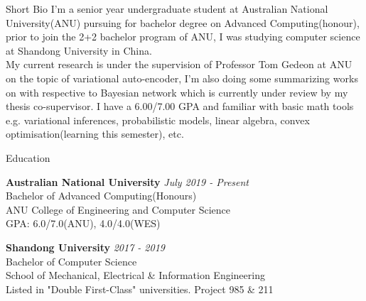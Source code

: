 \documentclass{resume} %
\begin{document}
\begin{rSection}{Short Bio}
I'm a senior year undergraduate student at Australian National University(ANU) pursuing for bachelor degree on Advanced Computing(honour), prior to join the 2+2 bachelor program of ANU, I was studying computer science at Shandong University in China.\\
My current research is under the supervision of Professor Tom Gedeon at ANU on the topic of variational auto-encoder, I’m also doing some summarizing works on with respective to Bayesian network which is currently under review by my thesis co-supervisor. I have a 6.00/7.00 GPA and familiar with basic math tools e.g. variational inferences, probabilistic models, linear algebra, convex optimisation(learning this semester), etc.
\end{rSection}

\begin{rSection}{Education}

{\bf Australian National University} \hfill {\em July 2019 - Present} 
\\ Bachelor of Advanced Computing(Honours)
\\ ANU College of Engineering and Computer Science\\
 { GPA: 6.0/7.0(ANU), 4.0/4.0(WES) }
 
 {\bf Shandong University} \hfill {\em 2017 - 2019} 
\\ Bachelor of Computer Science
\\ School of Mechanical, Electrical \& Information Engineering
\\ Listed in "Double First-Class" universities. Project 985 \& 211


\end{rSection}
\end{document}
